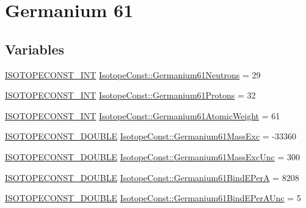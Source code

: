 \hypertarget{group___isotope_const-_germanium-_ge61}{}\section{Germanium 61}
\label{group___isotope_const-_germanium-_ge61}
\subsection*{Variables}
\begin{DoxyCompactItemize}
\item 
\mbox{\hyperlink{group___isotope_const-_macros_ga5f18360b3e99483a35c32d789e62621c}{I\+S\+O\+T\+O\+P\+E\+C\+O\+N\+S\+T\+\_\+\+I\+NT}} \mbox{\hyperlink{group___isotope_const-_germanium-_ge61_ga09dc845d915419225989a228aa9f2e14}{Isotope\+Const\+::\+Germanium61\+Neutrons}} = 29
\item 
\mbox{\hyperlink{group___isotope_const-_macros_ga5f18360b3e99483a35c32d789e62621c}{I\+S\+O\+T\+O\+P\+E\+C\+O\+N\+S\+T\+\_\+\+I\+NT}} \mbox{\hyperlink{group___isotope_const-_germanium-_ge61_gacdacfb3dd7a2156a40a4f8133c9990e9}{Isotope\+Const\+::\+Germanium61\+Protons}} = 32
\item 
\mbox{\hyperlink{group___isotope_const-_macros_ga5f18360b3e99483a35c32d789e62621c}{I\+S\+O\+T\+O\+P\+E\+C\+O\+N\+S\+T\+\_\+\+I\+NT}} \mbox{\hyperlink{group___isotope_const-_germanium-_ge61_ga622e2588761f89d25997b1a4618077ba}{Isotope\+Const\+::\+Germanium61\+Atomic\+Weight}} = 61
\item 
\mbox{\hyperlink{group___isotope_const-_macros_ga8f45a7272ce02c0b4c65c44636ed719a}{I\+S\+O\+T\+O\+P\+E\+C\+O\+N\+S\+T\+\_\+\+D\+O\+U\+B\+LE}} \mbox{\hyperlink{group___isotope_const-_germanium-_ge61_gaaf6858643c30b46b4090097b738622ed}{Isotope\+Const\+::\+Germanium61\+Mass\+Exc}} = -\/33360
\item 
\mbox{\hyperlink{group___isotope_const-_macros_ga8f45a7272ce02c0b4c65c44636ed719a}{I\+S\+O\+T\+O\+P\+E\+C\+O\+N\+S\+T\+\_\+\+D\+O\+U\+B\+LE}} \mbox{\hyperlink{group___isotope_const-_germanium-_ge61_ga51761f540a9a8d76b581c82e6f8459f1}{Isotope\+Const\+::\+Germanium61\+Mass\+Exc\+Unc}} = 300
\item 
\mbox{\hyperlink{group___isotope_const-_macros_ga8f45a7272ce02c0b4c65c44636ed719a}{I\+S\+O\+T\+O\+P\+E\+C\+O\+N\+S\+T\+\_\+\+D\+O\+U\+B\+LE}} \mbox{\hyperlink{group___isotope_const-_germanium-_ge61_ga9b183a62abf8bb22e4877abe6d3446ff}{Isotope\+Const\+::\+Germanium61\+Bind\+E\+PerA}} = 8208
\item 
\mbox{\hyperlink{group___isotope_const-_macros_ga8f45a7272ce02c0b4c65c44636ed719a}{I\+S\+O\+T\+O\+P\+E\+C\+O\+N\+S\+T\+\_\+\+D\+O\+U\+B\+LE}} \mbox{\hyperlink{group___isotope_const-_germanium-_ge61_gaf08550de0b9d98f445ead4303e14f724}{Isotope\+Const\+::\+Germanium61\+Bind\+E\+Per\+A\+Unc}} = 5

\end{DoxyCompactItemize}
